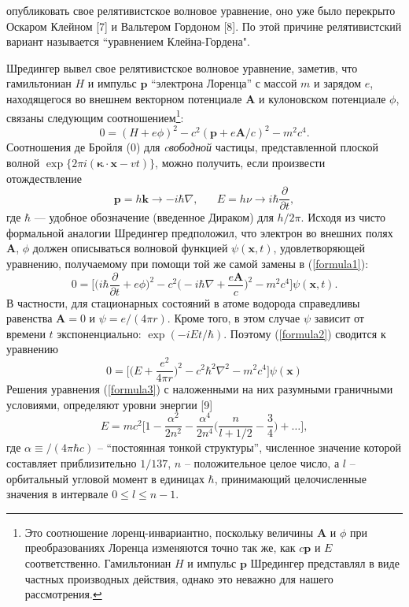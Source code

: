\documentclass{article}
\begin{document}
\pagestyle{fancy}
\setlength{\abovedisplayskip}{6pt}
\setlength{\abovedisplayshortskip}{6pt}
\setlength{\belowdisplayskip}{6pt}
\setlength{\belowdisplayshortskip}{6pt}
\noindent опубликовать свое релятивистское волновое уравнение, оно уже было перекрыто Оскаром Клейном [7] и Вальтером Гордоном [8]. По этой причине релятивистский вариант называется ``уравнением Клейна-Гордена".

Шредингер вывел свое релятивистское волновое уравнение, заметив, что гамильтониан $H$ и импульс $\textbf{p}$ ``электрона Лоренца'' с массой $m$ и зарядом $e$, находящегося во внешнем векторном потенциале $\textbf{A}$ и кулоновском потенциале $\phi$, связаны следующим соотношением\footnote{Это соотношение лоренц-инвариантно, поскольку величины $\textbf{A}$ и $\phi$ при преобразованиях Лоренца изменяются точно так же, как $c\textbf{p}$ и $E$ соответственно. Гамильтониан $H$ и импульс $\textbf{p}$ Шредингер представлял в виде частных производных действия, однако это неважно для нашего рассмотрения.}:
\begin{equation}
\label{formula1}
0 = (H+e\phi )^2-c^2(\textbf{p} +e\textbf{A} /c)^2-m^2c^4.
\end{equation}
Соотношения де Бройля (0) для \textit{cвободной} частицы, представленной плоской волной $\exp \{ 2 \pi i( \boldsymbol {\kappa} \cdot \textbf{x} -vt) \} $, можно получить, если произвести отождествление
\begin{equation}
\textbf{p} = h\textbf{k}\rightarrow -i\hbar\nabla,\;\;\;\;\;\; E=h\nu \rightarrow i\hbar \frac{\partial}{\partial t},
\end{equation}
где $\hbar$ — удобное обозначение (введенное Дираком) для $h/2 \pi$. Исходя из чисто формальной аналогии Шредингер предположил, что электрон во внешних полях $\textbf{A}$, $\phi$ должен описываться волновой функцией $\psi(\textbf{x},t)$, удовлетворяющей уравнению, получаемому при помощи той же самой замены в (\ref{formula1}):
\begin{equation}
\label{formula2}
0 = \biggl[\biggl(i\hbar \frac{\partial}{\partial t}+e\phi \biggr)^2 - c^2\biggl(-i\hbar \nabla +\frac{e \textbf{A}}{c}\biggr)^2-m^2c^4\biggr]\psi (\textbf {x},t).
\end{equation}
В частности, для стационарных состояний в атоме водорода справедливы равенства $\textbf{A} = 0$ и $\psi = e/(4\pi r)$. Кроме того, в этом случае $\psi$ зависит от времени $t$ экспоненциально: $\exp(-iEt/\hbar)$. Поэтому (\ref{formula2}) сводится к уравнению
\begin{equation}
\label{formula3}
0 = \biggl[\biggl(E+\frac{e^2}{4\pi r}\biggr)^2-c^2\hbar^2\nabla^2-m^2c^4\biggr]\psi (\textbf{x})
\end{equation}
Решения уравнения (\ref{formula3}) с наложенными на них разумными граничными условиями, определяют уровни энергии [9]
\begin{equation}
E = mc^2\biggl[1-\frac{\alpha^2}{2n^2}-\frac{\alpha^4}{2n^4}\biggl(\frac{n}{l+1/2}-\frac{3}{4}\biggl)+\ldots \biggr],
\end{equation}
где $\alpha\equiv /(4\pi\hbar c)$ -- ``постоянная тонкой структуры'', численное значение которой составляет приблизительно $1/137$, $n$ -- положительное целое число, а $l$ -- орбитальный угловой момент в единицах $\hbar$, принимающий целочисленные значения в интервале $0\le l\le n-1$.
\end{document}
